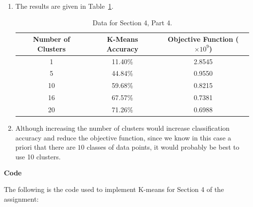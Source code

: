 \documentclass[11pt]{article}
\begin{document}
\begin{enumerate}
\item The results are given in Table~\ref{tab:4.4}. \\

\begin{table}
\centering
\begin{tabular}{|c|c|c|}
\hline
Number of Clusters  & K-Means Accuracy  & Objective Function ($\times 10^9$)    \\
\hline
1                   & 11.40\%           & 2.8545                                \\
\hline
5                   & 44.84\%           & 0.9550                                \\
\hline
10                  & 59.68\%           & 0.8215                                \\
\hline
16                  & 67.57\%           & 0.7381                                \\
\hline
20                  & 71.26\%           & 0.6988                                \\
\hline
\end{tabular}
\caption{Data for Section 4, Part 4.}
\label{tab:4.4}
\end{table}

\item Although increasing the number of clusters would increase classification
accuracy and reduce the objective function, since we know in this case a
priori that there are $10$ classes of data points, it would probably be best
to use 10 clusters.
\end{enumerate}

\newpage
{\bf Code}

The following is the code used to implement K-means for Section 4 of the
assignment:
\end{document}
